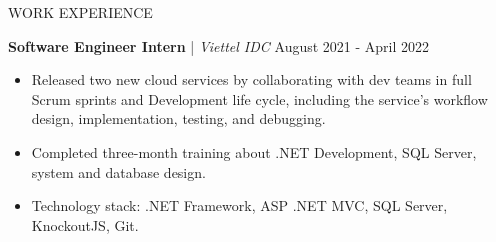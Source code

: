 \begin{rSection}{WORK EXPERIENCE}
    \vspace{1em}

    \quad\textbf{Software Engineer Intern} | \textit{Viettel IDC} \hfill August 2021 - April 2022\\
    \begin{itemize}
        \itemsep 0pt {} \vspace{-1em}
        \item Released two new cloud services by collaborating with dev teams in full Scrum sprints and Development life cycle,
              including the service's workflow design, implementation, testing, and debugging.
        \item Completed three-month training about .NET Development, SQL Server, system and database design.
        \item Technology stack: .NET Framework, ASP .NET MVC, SQL Server, KnockoutJS, Git.

    \end{itemize}

\end{rSection}



